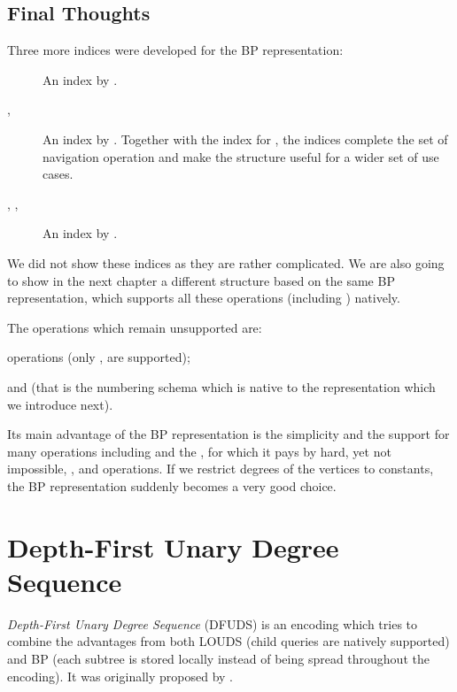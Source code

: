 \subsection{Final Thoughts}


Three more indices were developed for the BP representation:
\begin{description}
	\item[\degree{}]
	An index by \cite{chiang2005orderly}.

	\item[\childRank{}, \childSelect{}]
	An index by \cite{lu2008balanced}.
	Together with the index for \degree{}, the indices complete the set of navigation operation and make the structure useful for a wider set of use cases.

	\item[\levelAncestor{}, \levelPrev{}, \levelNext{}]
	An index by \cite{munro2012succinct}.
\end{description}
We did not show these indices as they are rather complicated.
We are also going to show in the next chapter a different structure based on the same BP representation, which supports all these operations (including \levelAny{}) natively.

The operations which remain unsupported are:
\begin{iteminline}
	\item \levelAny{} operations (only \levelPrev{}, \levelNext{} are supported);
	\item \dfudsRank{} and \dfudsSelect{} (that is the numbering schema which is native to the representation which we introduce next).
\end{iteminline}

Its main advantage of the BP representation is the simplicity and the support for many operations including \lca{} and the \dep{}, for which it pays by hard, yet not impossible, \childRank{}, \childSelect{} and \degree{} operations.
If we restrict degrees of the vertices to constants, the BP representation suddenly becomes a very good choice.

\section{Depth-First Unary Degree Sequence}

\emph{Depth-First Unary Degree Sequence} (DFUDS) is an encoding which tries to combine the advantages from both LOUDS (child queries are natively supported) and BP (each subtree is stored locally instead of being spread throughout the encoding).
It was originally proposed by \cite{benoit1999representing}.

